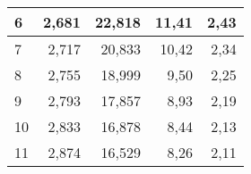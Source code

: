 {\begin{center}
\begin{tabular}{|l|r|r|r|r|}
6  & 2,681                                                                            & 22,818                                                                                                                         & 11,41                                                                                                                                            & 2,43                                           \\ \hline
7  & 2,717                                                                            & 20,833                                                                                                                         & 10,42                                                                                                                                            & 2,34                                           \\ \hline
8  & 2,755                                                                            & 18,999                                                                                                                         & 9,50                                                                                                                                             & 2,25                                           \\ \hline
9  & 2,793                                                                            & 17,857                                                                                                                         & 8,93                                                                                                                                             & 2,19                                           \\ \hline
10 & 2,833                                                                            & 16,878                                                                                                                         & 8,44                                                                                                                                             & 2,13                                           \\ \hline
11 & 2,874                                                                            & 16,529                                                                                                                         & 8,26                                                                                                                                             & 2,11                                           \\ \hline

\end{tabular}
\end{center}}
